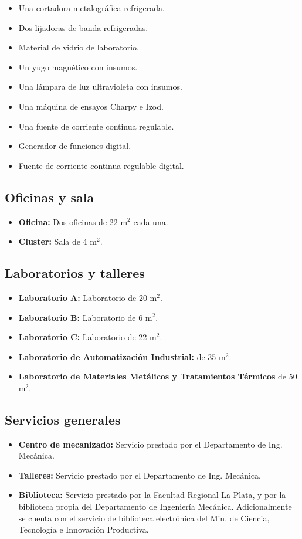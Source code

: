 \documentclass[a4paper,11pt,twoside,final,titlepage,onecolumn,openright]{report}
\begin{document}
\begin{itemize}
	\item Una cortadora metalográfica refrigerada.
	\item Dos lijadoras de banda refrigeradas.
	\item Material de vidrio de laboratorio.
	\item Un yugo magnético con insumos.
	\item Una lámpara de luz ultravioleta con insumos.
	\item Una máquina de ensayos Charpy e Izod.
	\item Una fuente de corriente continua regulable.
	\item Generador de funciones digital.
	\item Fuente de corriente continua regulable digital.
\end{itemize}

\subsection{Oficinas y sala}

\begin{itemize}
	\item {\bf Oficina:} Dos oficinas de 22 m$^2$ cada una.
	\item {\bf Cluster:} Sala de 4 m$^2$.
\end{itemize}

\subsection{Laboratorios y talleres}

\begin{itemize}
	\item {\bf Laboratorio A:} Laboratorio de 20 m$^2$.
	\item {\bf Laboratorio B:} Laboratorio de 6 m$^2$.
	\item {\bf Laboratorio C:} Laboratorio de 22 m$^2$.
	\item \textbf{Laboratorio de Automatización Industrial:} de 35 m$^2$.
	\item \textbf{Laboratorio de Materiales Metálicos y Tratamientos Térmicos} de 50 m$^2$.
\end{itemize}

\subsection{Servicios generales}

\begin{itemize}
	\item {\bf Centro de mecanizado:} Servicio prestado por el Departamento de Ing. Mecánica.
	\item {\bf Talleres:} Servicio prestado por el Departamento de Ing. Mecánica.
	\item {\bf Biblioteca:} Servicio prestado por la Facultad Regional La Plata, y por la biblioteca propia del Departamento de Ingeniería Mecánica. Adicionalmente se cuenta con el servicio de biblioteca electrónica del Min. de Ciencia, Tecnología e Innovación Productiva.
\end{itemize}
\end{document}
